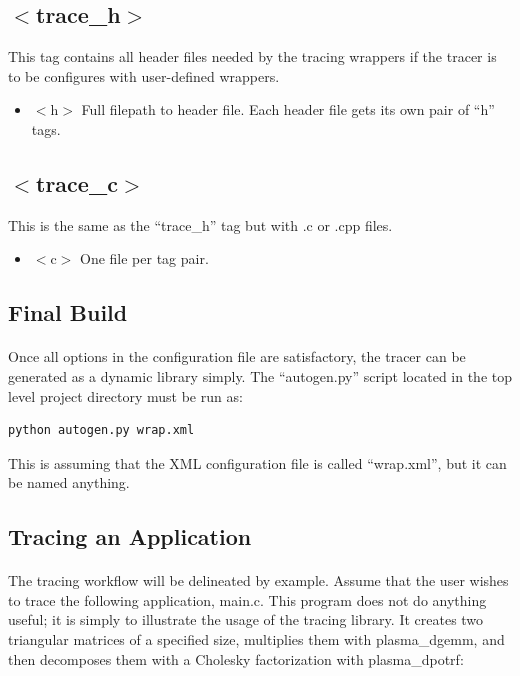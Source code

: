 \documentclass{article}
\begin{document}
\subsection{$<$trace\_h$>$} This tag contains all header files needed by the tracing wrappers if the tracer is to be configures with user-defined wrappers.
\begin{itemize}
\item $<$h$>$ Full filepath to header file. Each header file gets its own pair of ``h'' tags.
\end{itemize}
\subsection{$<$trace\_c$>$} This is the same as the ``trace\_h'' tag but with .c or .cpp files.
\begin{itemize}
\item $<$c$>$ One file per tag pair.
\end{itemize}
\subsection{Final Build}
\paragraph{}
Once all options in the configuration file are satisfactory, the tracer can be generated as a dynamic library simply. The ``autogen.py'' script located in the top level project directory must be run as: 

\begin{lstlisting}[language=bash]
python autogen.py wrap.xml
\end{lstlisting}

This is assuming that the XML configuration file is called ``wrap.xml'', but it can be named anything.

\subsection{Tracing an Application}
\paragraph{}
The tracing workflow will be delineated by example. Assume that the user wishes to trace the following application, main.c. This program does not do anything useful; it is simply to illustrate the usage of the tracing library. It creates two triangular matrices of a specified size, multiplies them with plasma\_dgemm, and then decomposes them with a Cholesky factorization with plasma\_dpotrf:
\end{document}
